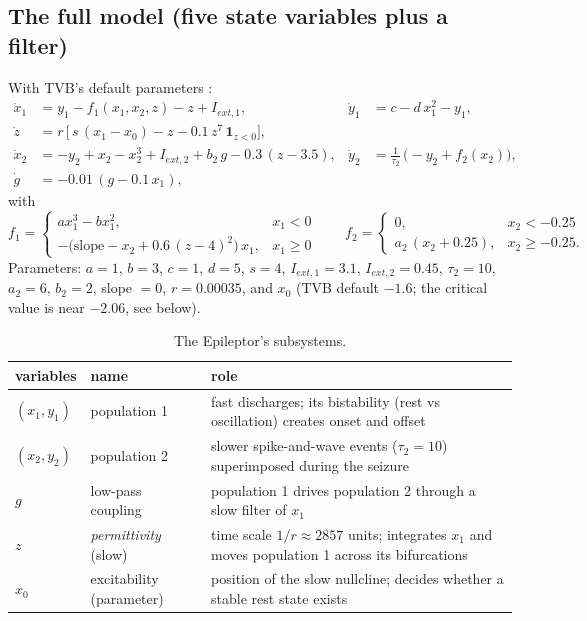 \documentclass[11pt]{article}
\begin{document}
\subsection{The full model (five state variables plus a filter)}
With TVB's default parameters \cite{sanzleon2013}:
\begin{align}
\dot x_1 &= y_1 - f_1(x_1, x_2, z) - z + I_{ext,1}, &
\dot y_1 &= c - d\,x_1^2 - y_1, \label{eq:pop1}\\
\dot z   &= r\,\big[\,s\,(x_1 - x_0) - z - 0.1\,z^7\,\mathbf 1_{z<0}\big], \label{eq:z}\\
\dot x_2 &= -y_2 + x_2 - x_2^3 + I_{ext,2} + b_2\, g - 0.3\,(z - 3.5), &
\dot y_2 &= \tfrac{1}{\tau_2}\,\big(-y_2 + f_2(x_2)\big), \label{eq:pop2}\\
\dot g &= -0.01\,(g - 0.1\,x_1), \label{eq:g}
\end{align}
with
\[
f_1 = \begin{cases} a x_1^3 - b x_1^2, & x_1 < 0\\ -\big(\mathrm{slope} - x_2 + 0.6\,(z-4)^2\big)\,x_1, & x_1\ge 0\end{cases}
\qquad
f_2 = \begin{cases} 0, & x_2 < -0.25\\ a_2\,(x_2 + 0.25), & x_2 \ge -0.25.\end{cases}
\]
Parameters: $a=1$, $b=3$, $c=1$, $d=5$, $s=4$, $I_{ext,1}=3.1$, $I_{ext,2}=0.45$, $\tau_2=10$, $a_2=6$,
$b_2=2$, slope $=0$, $r=0.00035$, and $x_0$ (TVB default $-1.6$; the critical value is near $-2.06$, see below).

\begin{table}[H]\centering\small
\begin{tabular}{>{\raggedright}p{2.7cm}>{\raggedright}p{3.3cm}p{8.6cm}}
\toprule
variables & name & role \\
\midrule
$(x_1, y_1)$ & population 1 & fast discharges; its bistability (rest vs oscillation) creates onset and offset \\
$(x_2, y_2)$ & population 2 & slower spike-and-wave events ($\tau_2=10$) superimposed during the seizure \\
$g$ & low-pass coupling & population 1 drives population 2 through a slow filter of $x_1$ \\
$z$ & \emph{permittivity} (slow) & time scale $1/r \approx 2857$ units; integrates $x_1$ and moves population 1 across its bifurcations \\
$x_0$ & excitability (parameter) & position of the slow nullcline; decides whether a stable rest state exists \\
\bottomrule
\end{tabular}
\caption{The Epileptor's subsystems.}
\end{table}
\end{document}
